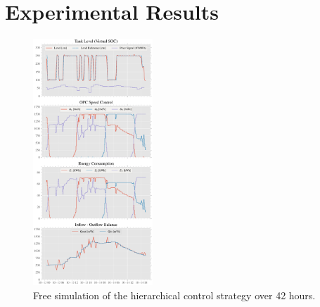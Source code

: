 \section{Experimental Results}


\begin{figure}[H]
    \centering
    \hspace{2cm}
    \includegraphics[width=0.4\textwidth]{img/results.pdf}
    \caption{Free simulation of the hierarchical control strategy over
    42 hours.}
    \label{fig:your_label}
\end{figure}